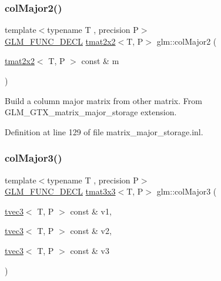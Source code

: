 \subsubsection{\texorpdfstring{colMajor2()}{colMajor2()}\hspace{0.1cm}{\footnotesize\ttfamily [2/2]}}
{\footnotesize\ttfamily template$<$typename T , precision P$>$ \\
\mbox{\hyperlink{setup_8hpp_ab2d052de21a70539923e9bcbf6e83a51}{G\+L\+M\+\_\+\+F\+U\+N\+C\+\_\+\+D\+E\+CL}} \mbox{\hyperlink{structglm_1_1tmat2x2}{tmat2x2}}$<$T, P$>$ glm\+::col\+Major2 (\begin{DoxyParamCaption}\item[{\mbox{\hyperlink{structglm_1_1tmat2x2}{tmat2x2}}$<$ T, P $>$ const \&}]{m }\end{DoxyParamCaption})}

Build a column major matrix from other matrix. From G\+L\+M\+\_\+\+G\+T\+X\+\_\+matrix\+\_\+major\+\_\+storage extension. 

Definition at line 129 of file matrix\+\_\+major\+\_\+storage.\+inl.

\mbox{\label{group__gtx__matrix__major__storage_ga3a55e2948193e91733e434e7cc3c1540}} 
\subsubsection{\texorpdfstring{colMajor3()}{colMajor3()}\hspace{0.1cm}{\footnotesize\ttfamily [1/2]}}
{\footnotesize\ttfamily template$<$typename T , precision P$>$ \\
\mbox{\hyperlink{setup_8hpp_ab2d052de21a70539923e9bcbf6e83a51}{G\+L\+M\+\_\+\+F\+U\+N\+C\+\_\+\+D\+E\+CL}} \mbox{\hyperlink{structglm_1_1tmat3x3}{tmat3x3}}$<$T, P$>$ glm\+::col\+Major3 (\begin{DoxyParamCaption}\item[{\mbox{\hyperlink{structglm_1_1tvec3}{tvec3}}$<$ T, P $>$ const \&}]{v1,  }\item[{\mbox{\hyperlink{structglm_1_1tvec3}{tvec3}}$<$ T, P $>$ const \&}]{v2,  }\item[{\mbox{\hyperlink{structglm_1_1tvec3}{tvec3}}$<$ T, P $>$ const \&}]{v3 }\end{DoxyParamCaption})}

